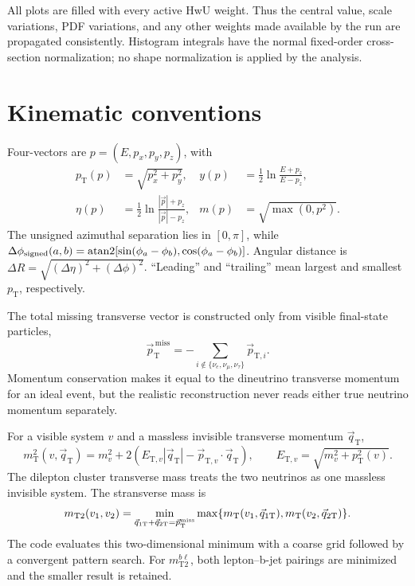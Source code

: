 \documentclass[10pt,a4paper]{article}
\newcommand{\pt}{p_{\mathrm T}}
\newcommand{\ddphi}{\Delta\phi}
\newcommand{\dr}{\Delta R}
\begin{document}
All plots are filled with every active HwU weight.  Thus the central value,
scale variations, PDF variations, and any other weights made available by the
run are propagated consistently.  Histogram integrals have the normal
fixed-order cross-section normalization; no shape normalization is applied by
the analysis.

\section{Kinematic conventions}

Four-vectors are \(p=(E,p_x,p_y,p_z)\), with
\begin{align}
 \pt(p)&=\sqrt{p_x^2+p_y^2}, &
 y(p)&=\frac12\ln\frac{E+p_z}{E-p_z},\\
 \eta(p)&=\frac12\ln\frac{|\vec p|+p_z}{|\vec p|-p_z}, &
 m(p)&=\sqrt{\max(0,p^2)}.
\end{align}
The unsigned azimuthal separation lies in \([0,\pi]\), while
\(\ddphi_{\rm signed}(a,b)=\operatorname{atan2}[\sin(\phi_a-\phi_b),
\cos(\phi_a-\phi_b)]\).  Angular distance is
\(\dr=\sqrt{(\Delta\eta)^2+(\ddphi)^2}\).  ``Leading'' and ``trailing''
mean largest and smallest \(\pt\), respectively.

The total missing transverse vector is constructed only from visible
final-state particles,
\begin{equation}
 \vec p_{\mathrm T}^{\,\mathrm{miss}}
 =-\sum_{i\notin\{\nu_e,\nu_\mu,\nu_\tau\}}\vec p_{\mathrm T,i}.
\end{equation}
Momentum conservation makes it equal to the dineutrino transverse momentum
for an ideal event, but the realistic reconstruction never reads either true
neutrino momentum separately.

For a visible system \(v\) and a massless invisible transverse momentum
\(\vec q_{\mathrm T}\),
\begin{equation}
 m_{\mathrm T}^2(v,\vec q_{\mathrm T})=m_v^2+2
 \left(E_{\mathrm T,v}|\vec q_{\mathrm T}|-
       \vec p_{\mathrm T,v}\!\cdot\!\vec q_{\mathrm T}\right),
 \qquad E_{\mathrm T,v}=\sqrt{m_v^2+\pt^2(v)}.
\end{equation}
The dilepton cluster transverse mass treats the two neutrinos as one massless
invisible system.  The stransverse mass is
\begin{equation}
 m_{\mathrm T2}(v_1,v_2)=
 \min_{\vec q_{1\mathrm T}+\vec q_{2\mathrm T}=\vec p_{\mathrm T}^{\rm miss}}
 \max\{m_{\mathrm T}(v_1,\vec q_{1\mathrm T}),
       m_{\mathrm T}(v_2,\vec q_{2\mathrm T})\}.
\end{equation}
The code evaluates this two-dimensional minimum with a coarse grid followed
by a convergent pattern search.  For \(m_{\mathrm T2}^{b\ell}\), both
lepton--b-jet pairings are minimized and the smaller result is retained.
\end{document}
